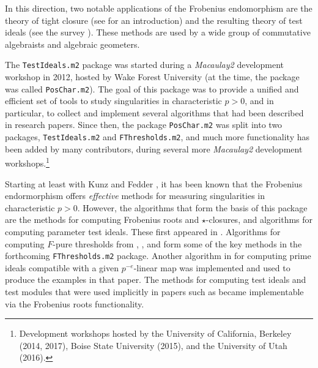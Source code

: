 \documentclass{amsart}
\begin{document}
In this direction, two notable applications of the Frobenius endomorphism are the theory of tight closure
(see \cite{HochsterHunekeTC1,HochsterFoundations} for an introduction)
and the resulting theory of test ideals
(see the survey \cite{SchwedeTuckerTestIdealSurvey}).  These methods are used by a wide group of commutative algebraists and algebraic geometers.

The \texttt{TestIdeals.m2} package was started during a \emph{Macaulay2} development workshop in 2012, hosted by Wake Forest University (at the time, the package was called \texttt{PosChar.m2}).  The goal of this package was to provide a unified and efficient set of tools to study singularities in characteristic $p > 0$, and in particular, to collect and implement several algorithms that had been described in research papers.  Since then, the package \texttt{PosChar.m2} was split into two packages, \texttt{TestIdeals.m2} and \texttt{FThresholds.m2}, and
much more functionality has been added by many contributors, during several more \emph{Macaulay2} development workshops.\footnote{Development workshops hosted by the University of California, Berkeley (2014, 2017), Boise State University (2015), and the University of Utah (2016).}

Starting at least with Kunz \cite{Kunz1969} and Fedder \cite{FedderFPureRat}, it has been known that the Frobenius endormorphism offers \emph{effective} methods for measuring singularities in characteristic $p > 0$.
However, the algorithms that form the basis of this package are the methods for computing Frobenius roots and $\star$-closures, and algorithms for computing parameter test ideals.
These first appeared in \cite{KatzmanParameterTestIdealOfCMRings,BlickleMustataSmithDiscretenessAndRationalityOfFThresholds,BlickleMustataSmithFThresholdsOfHypersurfaces,KatzmanFrobeniusMapsOnInjectiveHulls}.
Algorithms for computing $F$-pure thresholds from \cite{HernandezFInvariantsOfDiagonalHyp}, \cite{HernandezFPureThresholdOfBinomial}, and \cite{HernandezTeixeiraFThresholdFunctions} form some of the key methods in the forthcoming \texttt{FThresholds.m2} package.
Another algorithm in \cite{KatzmanSchwedeAlgorithm} for computing prime ideals compatible with a given $p^{-e}$-linear map was implemented and used to produce the examples in that paper.  The methods for computing test ideals and test modules that were used implicitly in papers such as \cite{BlickleSchwedeTakagiZhang,KatzmanLyubeznikZhangOnDiscretenessAndRationality,SchwedeTuckerTestIdealFiniteMaps} became implementable via the Frobenius roots functionality.
\end{document}
